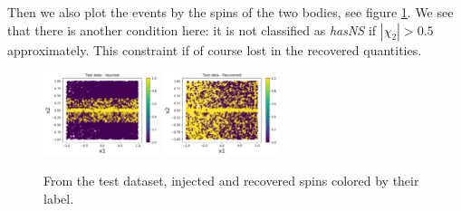 \documentclass[prd,aps,twocolumn,a4paper,showkeys,nofootinbib]{revtex4-2}
\begin{document}
Then we also plot the events by the spins of the two bodies, see figure \ref{fig:label_x}. We see that there is another condition here: it is not classified as \textit{hasNS} if $|\chi_2|>0.5$ approximately. This constraint if of course lost in the recovered quantities.

\begin{figure}[]
  \center
  \includegraphics[width=0.3\textwidth]{./FigNS/label_xinjected}
  \includegraphics[width=0.3\textwidth]{./FigNS/label_xrecovered}
  \caption{\label{fig:label_x} From the test dataset, injected and recovered spins colored by their label.}
\end{figure}
\end{document}
